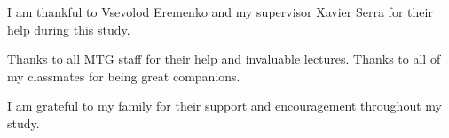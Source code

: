 
\begin{acknowledgement}

I am thankful to Vsevolod Eremenko and my supervisor Xavier Serra for their help during this study. 

Thanks to all MTG staff for their help and invaluable lectures. Thanks to all of my classmates for being great companions.

I am grateful to my family for their support and encouragement throughout my study.


\newpage
\end{acknowledgement}